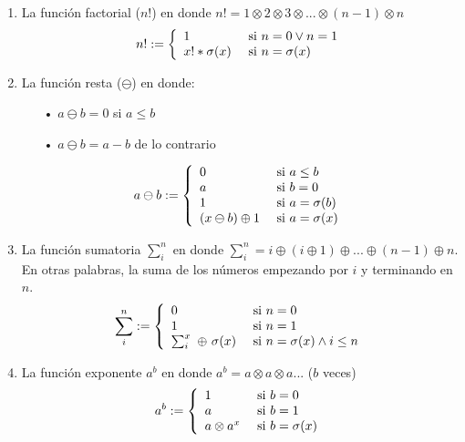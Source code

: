 \documentclass[11pt,letterpaper]{article}
\begin{document}
\begin{enumerate}
\item La función factorial ($n!$) en donde $n! = 1 \otimes 2 \otimes 3 \otimes ... \otimes (n-1) \otimes n$
\[
	n! := \left\{
    \begin{array}{l l}
    	1 & \ \mbox{si } n=0 \lor n=1 \\
    	x! * \sigma(x) & \ \mbox{si } n=\sigma(x) \\
	\end{array}
    \right.
\]
\vspace{0.5cm}

\item La función resta ($\ominus$) en donde:
\begin{itemize}
\item[•] $a \ominus b = 0$ si $a \leq b$
\item[•] $a \ominus b = a - b$ de lo contrario
\end{itemize}
\[
	a \ominus b := \left\{
    \begin{array}{l l}
    	0 & \ \mbox{si } a \leq b \\
    	a & \ \mbox{si } b = 0 \\
    	1 & \ \mbox{si } a = \sigma(b) \\
    	(x \ominus b) \oplus 1 & \ \mbox{si } a=\sigma(x) \\
	\end{array}
    \right.
\]
\vspace{0.5cm}

\item La función sumatoria $\sum_{i}^{n}$ en donde $\sum_{i}^{n} = i \oplus (i \oplus 1) \oplus ... \oplus (n - 1) \oplus n$. En otras palabras, la suma de los números empezando por $i$ y terminando en $n$.
\[
	\sum_{i}^{n} := \left\{
    \begin{array}{l l}
    	0 & \ \mbox{si } n = 0 \\
    	1 & \ \mbox{si } n = 1 \\
    	\sum_{i}^{x}\ \oplus\ \sigma(x) & \ \mbox{si } n=\sigma(x) \wedge i \leq n\\
	\end{array}
    \right.
\]
\vspace{0.5cm}

\item La función exponente $a^b$ en donde $a^b = a \otimes a \otimes a ...$ ($b$ veces)
\[
	a^b := \left\{
    \begin{array}{l l}
    	1 & \ \mbox{si } b = 0 \\
    	a & \ \mbox{si } b = 1 \\
    	a \otimes a^x & \ \mbox{si } b = \sigma(x) \\
	\end{array}
    \right.
\]
\end{enumerate}
\pagebreak
\end{document}
